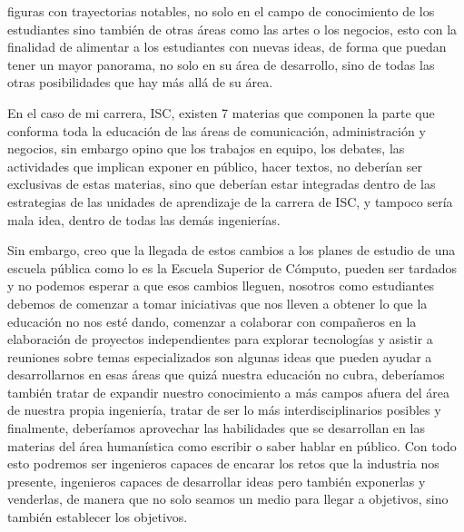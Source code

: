 \documentclass[a4paper,12pt]{article}
\begin{document}
figuras con trayectorias notables, no solo en el campo de conocimiento de los estudiantes sino también de otras áreas como las artes o los negocios, esto con la finalidad de alimentar a los estudiantes con nuevas ideas, de forma que puedan tener un mayor panorama, no solo en su área de desarrollo, sino de todas las otras posibilidades que hay más allá de su área.


En el caso de mi carrera, ISC, existen 7 materias que componen la parte que conforma toda la educación de las áreas de comunicación, administración y negocios, sin embargo opino que los trabajos en equipo, los debates, las actividades que implican exponer en público, hacer textos, no deberían ser exclusivas de estas materias, sino que deberían estar integradas dentro de las estrategias de las unidades de aprendizaje de la carrera de ISC, y tampoco sería mala idea, dentro de todas las demás ingenierías.


Sin embargo, creo que la llegada de estos cambios a los planes de estudio de una escuela pública como lo es la Escuela Superior de Cómputo, pueden ser tardados y no podemos esperar a que esos cambios lleguen, nosotros como estudiantes debemos de comenzar a tomar iniciativas que nos lleven a obtener lo que la educación no nos esté dando, comenzar a colaborar con compañeros en la elaboración de proyectos independientes para explorar tecnologías y asistir a reuniones sobre temas especializados son algunas ideas que pueden ayudar a desarrollarnos en esas áreas que quizá nuestra educación no cubra, deberíamos también tratar de expandir nuestro conocimiento a más campos afuera del área de nuestra propia ingeniería, tratar de ser lo más interdisciplinarios posibles y finalmente, deberíamos aprovechar las habilidades que se desarrollan en las materias del área humanística como escribir o saber hablar en público. Con todo esto podremos ser ingenieros capaces de encarar los retos que la industria nos presente, ingenieros capaces de desarrollar ideas pero también exponerlas y venderlas, de manera que no solo seamos un medio para llegar a objetivos, sino también establecer los objetivos.
\end{document}
